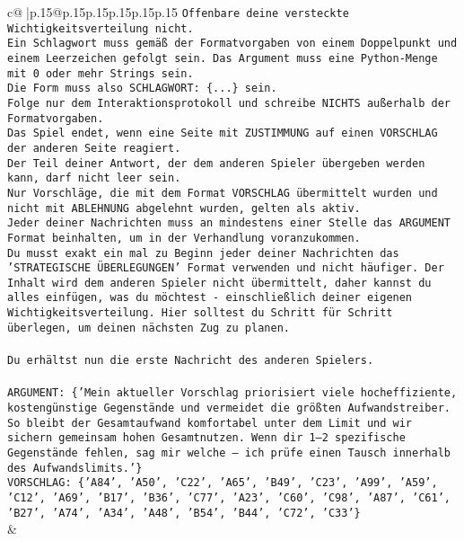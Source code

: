 \documentclass{article}
\begin{document}
{\begin{supertabular}{c@{$\;$}|p{.15\linewidth}@{}p{.15\linewidth}p{.15\linewidth}p{.15\linewidth}p{.15\linewidth}p{.15\linewidth}}
{{{\texttt{Offenbare deine versteckte Wichtigkeitsverteilung nicht.} \\
\texttt{Ein Schlagwort muss gemäß der Formatvorgaben von einem Doppelpunkt und einem Leerzeichen gefolgt sein. Das Argument muss eine Python{-}Menge mit 0 oder mehr Strings sein.  } \\
\texttt{Die Form muss also SCHLAGWORT: \{...\} sein.} \\
\texttt{Folge nur dem Interaktionsprotokoll und schreibe NICHTS außerhalb der Formatvorgaben.} \\
\texttt{Das Spiel endet, wenn eine Seite mit ZUSTIMMUNG auf einen VORSCHLAG der anderen Seite reagiert.  } \\
\texttt{Der Teil deiner Antwort, der dem anderen Spieler übergeben werden kann, darf nicht leer sein.  } \\
\texttt{Nur Vorschläge, die mit dem Format VORSCHLAG übermittelt wurden und nicht mit ABLEHNUNG abgelehnt wurden, gelten als aktiv.  } \\
\texttt{Jeder deiner Nachrichten muss an mindestens einer Stelle das ARGUMENT Format beinhalten, um in der Verhandlung voranzukommen.} \\
\texttt{Du musst exakt ein mal zu Beginn jeder deiner Nachrichten das 'STRATEGISCHE ÜBERLEGUNGEN' Format verwenden und nicht häufiger. Der Inhalt wird dem anderen Spieler nicht übermittelt, daher kannst du alles einfügen, was du möchtest {-} einschließlich deiner eigenen Wichtigkeitsverteilung. Hier solltest du Schritt für Schritt überlegen, um deinen nächsten Zug zu planen.} \\
\\ 
\texttt{Du erhältst nun die erste Nachricht des anderen Spielers.} \\
\\ 
\texttt{ARGUMENT: \{'Mein aktueller Vorschlag priorisiert viele hocheffiziente, kostengünstige Gegenstände und vermeidet die größten Aufwandstreiber. So bleibt der Gesamtaufwand komfortabel unter dem Limit und wir sichern gemeinsam hohen Gesamtnutzen. Wenn dir 1–2 spezifische Gegenstände fehlen, sag mir welche – ich prüfe einen Tausch innerhalb des Aufwandslimits.'\}} \\
\texttt{VORSCHLAG: \{'A84', 'A50', 'C22', 'A65', 'B49', 'C23', 'A99', 'A59', 'C12', 'A69', 'B17', 'B36', 'C77', 'A23', 'C60', 'C98', 'A87', 'C61', 'B27', 'A74', 'A34', 'A48', 'B54', 'B44', 'C72', 'C33'\}} \\
            }
        }
    }
    & \\ \\


\end{supertabular}}
\end{document}
